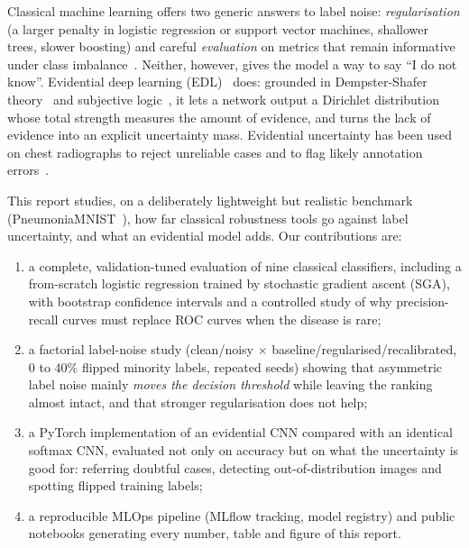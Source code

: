 \documentclass[11pt,a4paper]{article}
\begin{document}
Classical machine learning offers two generic answers to label noise: \emph{regularisation} (a larger penalty in
logistic regression or support vector machines, shallower trees, slower boosting) and careful \emph{evaluation} on
metrics that remain informative under class imbalance~\cite{saito2015precision}. Neither, however, gives the model a
way to say ``I do not know''. Evidential deep learning (EDL)~\cite{sensoy2018evidential} does: grounded in
Dempster-Shafer theory~\cite{dempster1967upper,shafer1976mathematical} and subjective logic~\cite{josang2016subjective},
it lets a network output a Dirichlet distribution whose total strength measures the amount of evidence, and turns the
lack of evidence into an explicit uncertainty mass. Evidential uncertainty has been used on chest radiographs to
reject unreliable cases and to flag likely annotation errors~\cite{ghesu2019quantifying,ghesu2021quantifying}.

This report studies, on a deliberately lightweight but realistic benchmark (PneumoniaMNIST~\cite{yang2023medmnist}),
how far classical robustness tools go against label uncertainty, and what an evidential model adds. Our contributions are:
\begin{enumerate}
  \item a complete, validation-tuned evaluation of nine classical classifiers, including a from-scratch logistic
        regression trained by stochastic gradient ascent (SGA), with bootstrap confidence intervals and a controlled
        study of why precision-recall curves must replace ROC curves when the disease is rare;
  \item a factorial label-noise study (clean/noisy $\times$ baseline/regularised/recalibrated, 0 to 40\% flipped
        minority labels, repeated seeds) showing that asymmetric label noise mainly \emph{moves the decision threshold}
        while leaving the ranking almost intact, and that stronger regularisation does not help;
  \item a PyTorch implementation of an evidential CNN compared with an identical softmax CNN, evaluated not only on
        accuracy but on what the uncertainty is good for: referring doubtful cases, detecting out-of-distribution
        images and spotting flipped training labels;
  \item a reproducible MLOps pipeline (MLflow tracking, model registry) and public notebooks generating every number,
        table and figure of this report.
\end{enumerate}
\end{document}

